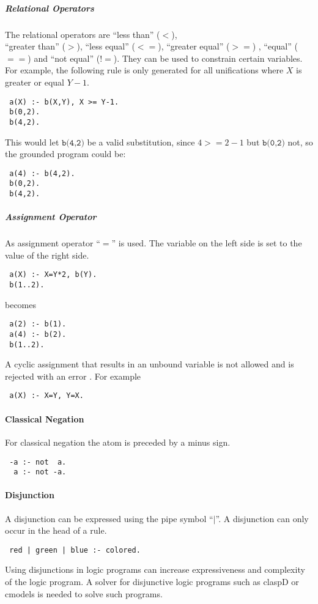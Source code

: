 \documentclass[a4paper,10pt]{article}
\begin{document}
\subparagraph{Relational Operators}
The relational operators are ``less than'' ($<$),\\ ``greater than'' ($>$), ``less equal'' ($<=$), ``greater equal'' ($>=$) , ``equal'' ($==$) and ``not equal'' ($!=$).
They can be used to constrain certain variables.
For example, the following rule is only generated for all unifications where $X$ is greater or equal $Y-1$.
\begin{verbatim}
 a(X) :- b(X,Y), X >= Y-1.
 b(0,2).
 b(4,2).
\end{verbatim}
This would let $\texttt{b(4,2)}$ be a valid substitution, since $4 >= 2-1$ but $\texttt{b(0,2)}$ not, so the grounded program could be:
\begin{verbatim}
 a(4) :- b(4,2).
 b(0,2).
 b(4,2).
\end{verbatim}

\subparagraph{Assignment Operator}
As assignment operator ``$=$'' is used.
The variable on the left side is set to the value of the right side.
\begin{verbatim}
 a(X) :- X=Y*2, b(Y).
 b(1..2).
\end{verbatim}
becomes
\begin{verbatim}
 a(2) :- b(1).
 a(4) :- b(2).
 b(1..2).
\end{verbatim}
A cyclic assignment that results in an unbound variable is not allowed and is rejected with an error . For example
\begin{verbatim}
 a(X) :- X=Y, Y=X.
\end{verbatim}

\paragraph{Classical Negation}
For classical negation the atom is preceded by a minus sign.
\begin{verbatim}
 -a :- not  a.
  a :- not -a. 
\end{verbatim}
\paragraph{Disjunction}
A disjunction can be expressed using the pipe symbol ``$\mid$''.
A disjunction can only occur in the head of a rule.
\begin{verbatim}
 red | green | blue :- colored.
\end{verbatim}
Using disjunctions in logic programs can increase expressiveness and complexity of the logic program.
A solver for disjunctive logic programs such as claspD \cite{claspD} or cmodels \cite{cmodels} is needed to solve such programs.
\end{document}
